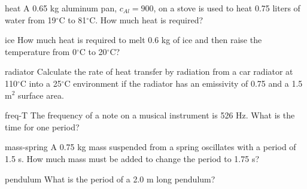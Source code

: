 \documentclass[letterpaper]{article}
\begin{document}
{\begin{question}{heat}
A 0.65 kg aluminum pan, $c_{Al}=900$, on a stove is used to heat 0.75 liters of water from 19$^\circ$C to 81$^\circ$C.  How much heat is required?
\begin{choices}
\correctchoice{ }%
\wrongchoice{ }%
\wrongchoice{ }%
\wrongchoice{ }%
\wrongchoice{ }%
\end{choices}
\end{question}

\begin{question}{ice}
How much heat is required to melt 0.6 kg of ice and then raise the temperature from 0$^\circ$C to 20$^\circ$C?
\begin{choices}
\correctchoice{ }%
\wrongchoice{ }%
\wrongchoice{ }%
\wrongchoice{ }%
\wrongchoice{ }%
\end{choices}
\end{question}

\begin{question}{radiator}
Calculate the rate of heat transfer by radiation from a car radiator at 110$^\circ$C into a 25$^\circ$C environment if the radiator has an emissivity of 0.75 and a 1.5 m$^2$ surface area.
\begin{choices}
\correctchoice{ }%
\wrongchoice{ }%
\wrongchoice{ }%
\wrongchoice{ }%
\wrongchoice{ }%
\end{choices}
\end{question}


\begin{question}{freq-T}
The frequency of a note on a musical instrument is 526 Hz. What is the time for one period?
\begin{choices}
\correctchoice{ }%
\wrongchoice{ }%
\wrongchoice{ }%
\wrongchoice{ }%
\wrongchoice{ }%
\end{choices}
\end{question}

\begin{question}{mass-spring}
A 0.75 kg mass suspended from a spring oscillates with a period of 1.5 s. How much mass must be added to change the period to 1.75 s?
\begin{choices}
\correctchoice{ }%
\wrongchoice{ }%
\wrongchoice{ }%
\wrongchoice{ }%
\wrongchoice{ }%
\end{choices}
\end{question}

\begin{question}{pendulum}
What is the period of a 2.0 m long pendulum?
\begin{choices}
\correctchoice{ }%
\wrongchoice{ }%
\wrongchoice{ }%
\wrongchoice{ }%
\wrongchoice{ }%
\end{choices}
\end{question}


  
  
  
  
  

\cleardoublepage

}
\end{document}
